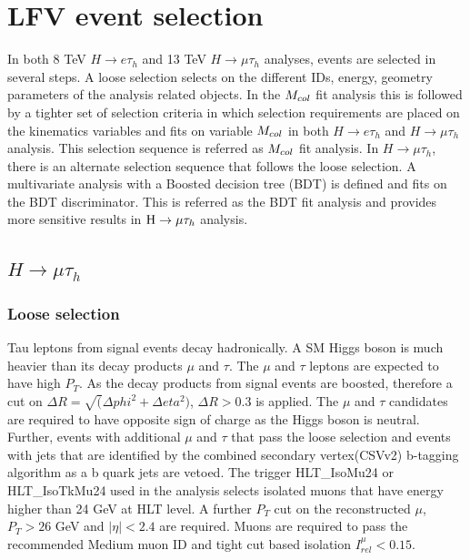

\chapter{LFV event selection}
In both 8 TeV $H\rightarrow e\tau_h$ and 13 TeV $H\rightarrow\mu\tau_h$ analyses, events are selected in several steps. A loose selection selects on the different IDs, energy, geometry parameters of the analysis related objects. In the $M_{col}$ fit analysis this is followed by a tighter set of selection criteria in which selection requirements are placed on the kinematics variables and fits on variable $M_{col}$ in both  $H\rightarrow e\tau_h$ and $H\rightarrow\mu\tau_h$ analysis. This selection sequence is referred as $M_{col}$ fit analysis. In $H\rightarrow\mu\tau_h$, there is an alternate selection sequence that follows the loose selection. A multivariate analysis with a Boosted decision tree (BDT) is defined and fits on the BDT discriminator. This is referred as the BDT fit analysis and provides more sensitive results in $\mathrm{H}\to \mu\tau_{h}$ analysis. 



\section{\texorpdfstring{$H\rightarrow\mu\tau_h$}{Lg}}
\subsection{Loose selection}
Tau leptons from signal events decay hadronically. A SM Higgs boson is much heavier than its decay products $\mu$ and $\tau$. The $\mu$ and $\tau$ leptons are expected to have high $P_{T}$. As the decay products from signal events are boosted, therefore a cut on $\Delta R=\sqrt(\Delta phi^{2}+\Delta eta^{2})$, $\Delta R>0.3$ is applied. The $\mu$ and $\tau$ candidates are required to have opposite sign of charge as the Higgs boson is neutral. Further, events with additional $\mu$ and $\tau$ that pass the loose selection and events with jets that are identified by the combined secondary vertex(CSVv2) b-tagging algorithm \cite{btag_ago} as a b quark jets are vetoed. The trigger HLT\_IsoMu24 or HLT\_IsoTkMu24 used in the analysis selects isolated muons that have energy higher than 24 GeV at HLT level. A further $P_{T}$ cut on the reconstructed $\mu$,  $P_{T}>26$ GeV and $|\eta|<2.4$ are required. Muons are required to pass the recommended Medium muon ID and tight cut based isolation $I^{\mu}_{rel}<0.15$. %

